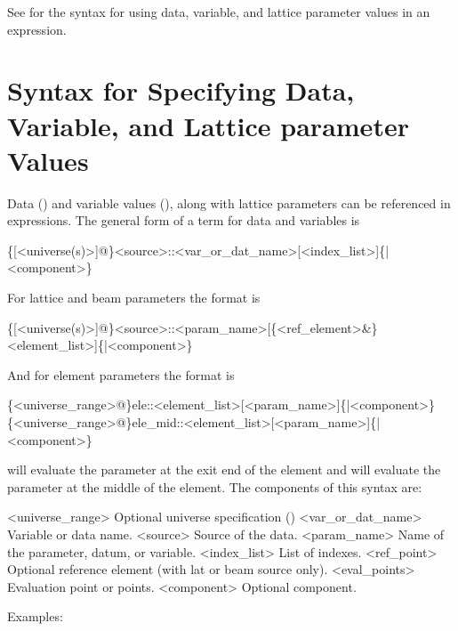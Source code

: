 See  for the syntax for using data, variable, and
lattice parameter values in an expression.

\section{Syntax for Specifying Data, Variable, and Lattice parameter Values}
\label{s:param.syntax}

Data () and variable values
(), along with lattice parameters can be
referenced in expressions. The general form of a term for
data and variables is
\begin{example}
  \{[<universe(s)>]@\}<source>::<var_or_dat_name>[<index_list>]\{|<component>\}
\end{example}
For lattice and beam parameters the format is
\begin{example}
  \{[<universe(s)>]@\}<source>::<param_name>[\{<ref_element>&\}<element_list>]\{|<component>\}
\end{example}
And for element parameters the format is
\begin{example}
  \{<universe_range>@\}ele::<element_list>[<param_name>]\{|<component>\}
  \{<universe_range>@\}ele_mid::<element_list>[<param_name>]\{|<component>\}
\end{example}
 will evaluate the parameter at the exit end of the element and 
 will evaluate the parameter at the middle of the element.
The components of this syntax are:
\begin{example}
  <universe_range>    Optional universe specification ()
  <var_or_dat_name>   Variable or data name.
  <source>            Source of the data.
  <param_name>        Name of the parameter, datum, or variable.
  <index_list>        List of indexes.
  <ref_point>         Optional reference element (with lat or beam source only).
  <eval_points>       Evaluation point or points.
  <component>         Optional component. 
\end{example}
Examples:

